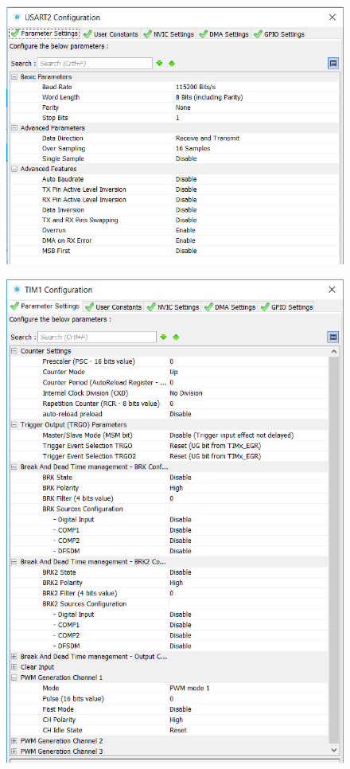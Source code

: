 \documentclass[10pt, a4paper]{article}
\begin{document}
\begin{enumerate}
\begin{figure}[H]
	\end{figure}
		\begin{figure}[H]
	\centering
	\includegraphics[width=\linewidth]{conf7.png}
	\end{figure}
		\begin{figure}[H]
	\centering
	\includegraphics[width=\linewidth]{conf8.png}
	\end{figure}
\end{enumerate}
\end{document}
